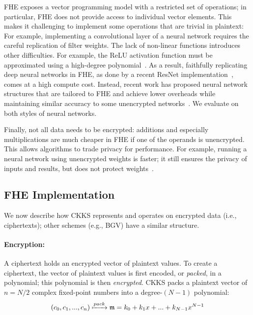 FHE exposes a vector programming model with a restricted set of operations; in particular,
FHE does not provide access to individual vector elements.
This makes it challenging to implement some operations
that are trivial in plaintext:
For example,
implementing a convolutional layer of a neural network requires the careful
replication of filter weights.
The lack of non-linear functions introduces other difficulties.
For example, the ReLU activation function must be approximated
using a high-degree polynomial~\cite{lee:2021:precise}.
%
As a result, faithfully replicating deep neural networks in FHE,
as done by a recent ResNet implementation~\cite{lee:2021:privacy}, comes at a high compute cost.
Instead, recent work has proposed neural network structures that are tailored to
FHE and achieve lower overheads while maintaining similar accuracy to some unencrypted networks~\cite{brutzkus:icml19:low}.
We evaluate \name on both styles of neural networks.

Finally, not all data needs to be encrypted:
additions and especially multiplications are much cheaper in FHE if one of the operands is unencrypted.
This allows algorithms to trade privacy for performance.
For example, running a neural network using unencrypted weights is faster; it
still ensures the privacy of inputs and results, but does not
protect weights~\cite{brutzkus:icml19:low}.

\subsection{FHE Implementation}

We now describe how CKKS represents and operates on encrypted data (i.e., ciphertexts);
other schemes
(e.g., BGV)
have a similar structure.

\paragraph{Encryption:} A ciphertext holds an encrypted vector of plaintext values.
To create a ciphertext, the vector of plaintext values is first encoded, or \emph{packed},
in a polynomial; this polynomial is then \emph{encrypted}.
CKKS packs a plaintext vector of $ n = N/2$ complex fixed-point numbers
into a degree-$(N-1)$ polynomial:
\begin{equation*}
    (c_0, c_1, ..., c_n) \xmapsto{pack} \mathfrak{m} = k_0 + k_1x + ... + k_{N-1}x^{N-1} %
\end{equation*}

